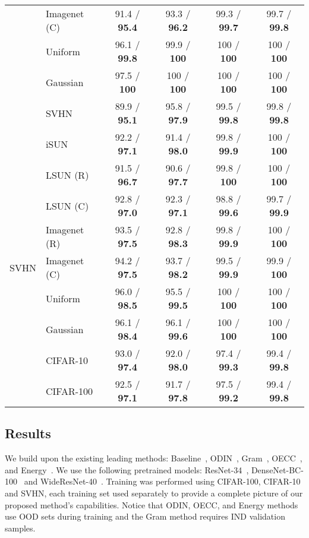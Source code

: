 \documentclass{article}
\begin{document}
\begin{table}[tb]
\begin{tabular}{clcccc}
     & Imagenet (C) &  91.4 / \textbf{95.4} &  93.3 / \textbf{96.2} &  99.3 / \textbf{99.7} &  99.7 / \textbf{99.8} \\
     & Uniform &  96.1 / \textbf{99.8} &   99.9 / \textbf{100} &    100 / \textbf{100} &    100 / \textbf{100} \\
     & Gaussian &   97.5 / \textbf{100} &    100 / \textbf{100} &    100 / \textbf{100} &    100 / \textbf{100} \\
     & SVHN &  89.9 / \textbf{95.1} &  95.8 / \textbf{97.9} &  99.5 / \textbf{99.8} &  99.8 / \textbf{99.8} \\
\midrule
\multirow{9}{*}{SVHN} & iSUN &  92.2 / \textbf{97.1} &  91.4 / \textbf{98.0} &  99.8 / \textbf{99.9} &    100 / \textbf{100} \\
     & LSUN (R) &  91.5 / \textbf{96.7} &  90.6 / \textbf{97.7} &   99.8 / \textbf{100} &    100 / \textbf{100} \\
     & LSUN (C) &  92.8 / \textbf{97.0} &  92.3 / \textbf{97.1} &  98.8 / \textbf{99.6} &  99.7 / \textbf{99.9} \\
     & Imagenet (R) &  93.5 / \textbf{97.5} &  92.8 / \textbf{98.3} &  99.8 / \textbf{99.9} &    100 / \textbf{100} \\
     & Imagenet (C) &  94.2 / \textbf{97.5} &  93.7 / \textbf{98.2} &  99.5 / \textbf{99.9} &   99.9 / \textbf{100} \\
     & Uniform &  96.0 / \textbf{98.5} &  95.5 / \textbf{99.5} &    100 / \textbf{100} &    100 / \textbf{100} \\
     & Gaussian &  96.1 / \textbf{98.4} &  96.1 / \textbf{99.6} &    100 / \textbf{100} &    100 / \textbf{100} \\
     & CIFAR-10 &  93.0 / \textbf{97.4} &  92.0 / \textbf{98.0} &  97.4 / \textbf{99.3} &  99.4 / \textbf{99.8} \\
     & CIFAR-100 &  92.5 / \textbf{97.1} &  91.7 / \textbf{97.8} &  97.5 / \textbf{99.2} &  99.4 / \textbf{99.8} \\
\bottomrule
\end{tabular}
 \end{table}


\subsection{Results} 
\label{sec:results}
We build upon the existing leading methods: Baseline~\citep{hendrycks17baseline}, ODIN~\citep{liang2017enhancing}, Gram~\citep{gram},  OECC~\citep{PAPADOPOULOS2021138}, and Energy~\citep{liu2020energy}.
We use the following pretrained models: ResNet-34~\citep{he2016deep}, DenseNet-BC-100~\citep{huang2017densely} and WideResNet-40~\citep{zagoruyko2016wide}. Training was performed using CIFAR-100, CIFAR-10 and SVHN, each training set used separately to provide a complete picture of our proposed method's capabilities. 
Notice that ODIN, OECC, and Energy methods use OOD sets during training and the Gram method requires IND validation samples.
\end{document}
